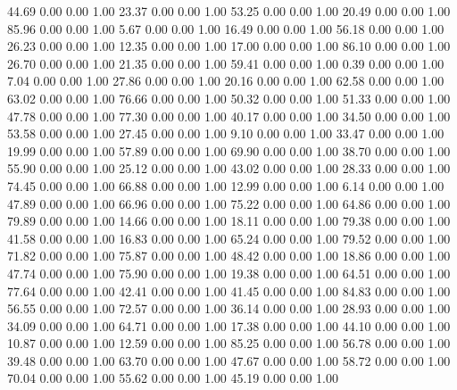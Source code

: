    44.69   0.00   0.00   1.00
   23.37   0.00   0.00   1.00
   53.25   0.00   0.00   1.00
   20.49   0.00   0.00   1.00
   85.96   0.00   0.00   1.00
    5.67   0.00   0.00   1.00
   16.49   0.00   0.00   1.00
   56.18   0.00   0.00   1.00
   26.23   0.00   0.00   1.00
   12.35   0.00   0.00   1.00
   17.00   0.00   0.00   1.00
   86.10   0.00   0.00   1.00
   26.70   0.00   0.00   1.00
   21.35   0.00   0.00   1.00
   59.41   0.00   0.00   1.00
    0.39   0.00   0.00   1.00
    7.04   0.00   0.00   1.00
   27.86   0.00   0.00   1.00
   20.16   0.00   0.00   1.00
   62.58   0.00   0.00   1.00
   63.02   0.00   0.00   1.00
   76.66   0.00   0.00   1.00
   50.32   0.00   0.00   1.00
   51.33   0.00   0.00   1.00
   47.78   0.00   0.00   1.00
   77.30   0.00   0.00   1.00
   40.17   0.00   0.00   1.00
   34.50   0.00   0.00   1.00
   53.58   0.00   0.00   1.00
   27.45   0.00   0.00   1.00
    9.10   0.00   0.00   1.00
   33.47   0.00   0.00   1.00
   19.99   0.00   0.00   1.00
   57.89   0.00   0.00   1.00
   69.90   0.00   0.00   1.00
   38.70   0.00   0.00   1.00
   55.90   0.00   0.00   1.00
   25.12   0.00   0.00   1.00
   43.02   0.00   0.00   1.00
   28.33   0.00   0.00   1.00
   74.45   0.00   0.00   1.00
   66.88   0.00   0.00   1.00
   12.99   0.00   0.00   1.00
    6.14   0.00   0.00   1.00
   47.89   0.00   0.00   1.00
   66.96   0.00   0.00   1.00
   75.22   0.00   0.00   1.00
   64.86   0.00   0.00   1.00
   79.89   0.00   0.00   1.00
   14.66   0.00   0.00   1.00
   18.11   0.00   0.00   1.00
   79.38   0.00   0.00   1.00
   41.58   0.00   0.00   1.00
   16.83   0.00   0.00   1.00
   65.24   0.00   0.00   1.00
   79.52   0.00   0.00   1.00
   71.82   0.00   0.00   1.00
   75.87   0.00   0.00   1.00
   48.42   0.00   0.00   1.00
   18.86   0.00   0.00   1.00
   47.74   0.00   0.00   1.00
   75.90   0.00   0.00   1.00
   19.38   0.00   0.00   1.00
   64.51   0.00   0.00   1.00
   77.64   0.00   0.00   1.00
   42.41   0.00   0.00   1.00
   41.45   0.00   0.00   1.00
   84.83   0.00   0.00   1.00
   56.55   0.00   0.00   1.00
   72.57   0.00   0.00   1.00
   36.14   0.00   0.00   1.00
   28.93   0.00   0.00   1.00
   34.09   0.00   0.00   1.00
   64.71   0.00   0.00   1.00
   17.38   0.00   0.00   1.00
   44.10   0.00   0.00   1.00
   10.87   0.00   0.00   1.00
   12.59   0.00   0.00   1.00
   85.25   0.00   0.00   1.00
   56.78   0.00   0.00   1.00
   39.48   0.00   0.00   1.00
   63.70   0.00   0.00   1.00
   47.67   0.00   0.00   1.00
   58.72   0.00   0.00   1.00
   70.04   0.00   0.00   1.00
   55.62   0.00   0.00   1.00
   45.19   0.00   0.00   1.00
